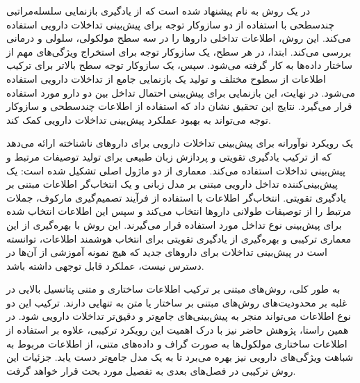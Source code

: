 در \cite{ref_dai2020} یک روش به نام  پیشنهاد شده است که از یادگیری بازنمایی سلسله‌مراتبی چندسطحی با استفاده از دو سازوکار توجه برای پیش‌بینی تداخلات دارویی استفاده می‌کند. این روش، اطلاعات تداخلی داروها را در سه سطح مولکولی، سلولی و درمانی بررسی می‌کند. ابتدا، در هر سطح، یک سازوکار توجه برای استخراج ویژگی‌های مهم از ساختار داده‌ها به کار گرفته می‌شود. سپس، یک سازوکار توجه سطح بالاتر برای ترکیب اطلاعات از سطوح مختلف و تولید یک بازنمایی جامع از تداخلات دارویی استفاده می‌شود. در نهایت، این بازنمایی برای پیش‌بینی احتمال تداخل بین دو دارو مورد استفاده قرار می‌گیرد. نتایج این تحقیق نشان داد که استفاده از اطلاعات چندسطحی و سازوکار توجه می‌تواند به بهبود عملکرد پیش‌بینی تداخلات دارویی کمک کند.

 \cite{ref_zhu2023} یک رویکرد نوآورانه برای پیش‌بینی تداخلات دارویی برای داروهای ناشناخته ارائه می‌دهد که از ترکیب یادگیری تقویتی و پردازش زبان طبیعی برای تولید توصیفات مرتبط و پیش‌بینی تداخلات استفاده می‌کند. معماری  از دو ماژول اصلی تشکیل شده است: یک پیش‌بینی‌کننده تداخل دارویی مبتنی بر مدل زبانی و یک انتخاب‌گر اطلاعات مبتنی بر یادگیری تقویتی. انتخاب‌گر اطلاعات با استفاده از فرآیند تصمیم‌گیری مارکوف، جملات مرتبط را از توصیفات طولانی داروها انتخاب می‌کند و سپس این اطلاعات انتخاب شده برای پیش‌بینی نوع تداخل مورد استفاده قرار می‌گیرند. این روش با بهره‌گیری از این معماری ترکیبی و بهره‌گیری از یادگیری تقویتی برای انتخاب هوشمند اطلاعات، توانسته است در پیش‌بینی تداخلات برای داروهای جدید که هیچ نمونه آموزشی از آن‌ها در دسترس نیست، عملکرد قابل توجهی داشته باشد.

به طور کلی، روش‌های مبتنی بر ترکیب اطلاعات ساختاری و متنی پتانسیل بالایی در غلبه بر محدودیت‌های روش‌های مبتنی بر ساختار یا متن به تنهایی دارند. ترکیب این دو نوع اطلاعات می‌تواند منجر به پیش‌بینی‌های جامع‌تر و دقیق‌تر تداخلات دارویی شود. در همین راستا، پژوهش حاضر نیز با درک اهمیت این رویکرد ترکیبی، علاوه بر استفاده از اطلاعات ساختاری مولکول‌ها به صورت گراف و داده‌های متنی، از اطلاعات مربوط به شباهت ویژگی‌های دارویی نیز بهره می‌برد تا به یک مدل جامع‌تر دست یابد. جزئیات این روش ترکیبی در فصل‌های بعدی به تفصیل مورد بحث قرار خواهد گرفت.

